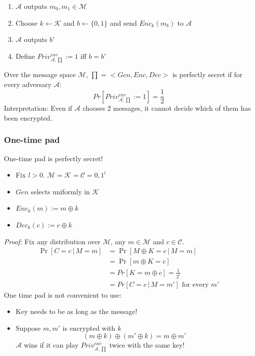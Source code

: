 \documentclass[12pt]{article}   	%
\begin{document}
\begin{enumerate}
\item $\mathcal{A}$ outputs $m_0,m_1 \in \mathcal{M}$
\item Choose $k \leftarrow \mathcal{K}$ and  $b \leftarrow \{0,1\}$ and send $Enc_k(m_b)$ to $\mathcal{A}$
 \item $\mathcal{A}$ outputs $b'$
 \item Define $Priv_{\mathcal{A},\prod}^{eav}:=1$ iff $b=b'$
\end{enumerate}

Over the message space $\mathcal{M}$, $\prod=<Gen,Enc,Dec>$ is perfectly secret if for every adversary $\mathcal{A}$:
\begin{equation}
Pr[Priv_{\mathcal{A},\prod}^{eav}:=1] = \frac{1}{2}
\end{equation}
Interpretation: Even if $\mathcal{A}$ chooses 2 messages, it cannot decide which of them has been encrypted.
\subsubsection{One-time pad}
One-time pad is perfectly secret!
\begin{itemize}
\item Fix $ l> 0$. $\mathcal{M}=\mathcal{K}=\mathcal{C}={0,1}^{l}$
\item $Gen$ selects uniformly in $\mathcal{K}$
\item $Enc_k(m) := m \oplus k$
\item $Dec_k(c) := c \oplus k$
\end{itemize}
\emph{Proof:} Fix any distribution over $\mathcal{M}$, any $m \in \mathcal{M}$ and $c \in \mathcal{C}$.
\begin{equation}
\begin{aligned}
    \Pr[ C=c \,|\,  M=m] &= \Pr[M \oplus K = c \, | \, M = m] \\
    &= \Pr[m \oplus K =c ]\\
    &= Pr[K=m\oplus c] = \frac{1}{2^l}\\
    &= Pr[C=c \,|\,M=m'] \text{ for every } m'
\end{aligned}
\end{equation}
One time pad is not convenient to use:
\begin{itemize}
\item Key needs to be as long as the message!
\item Suppose $m,m'$ is encrypted with $k$
\begin{equation}
(m\oplus k) \oplus (m'\oplus k) = m \oplus m'
\end{equation}
$\mathcal{A}$ wins if it can play $Priv_{\mathcal{A},\prod}^{eav}$ twice with the same key!
\end{itemize}
\end{document}
